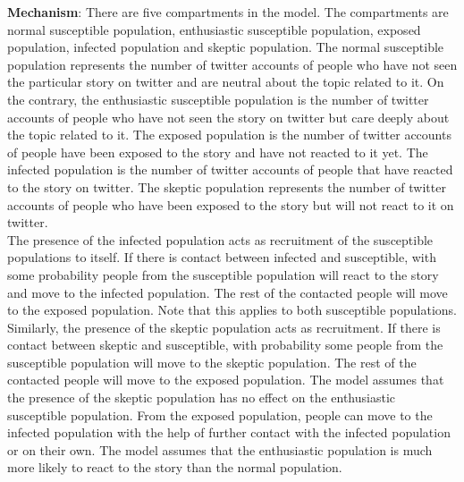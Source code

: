 \documentclass{article}
\begin{document}
\textbf{Mechanism}: There are five compartments in the model. The compartments are normal susceptible population, enthusiastic susceptible population, exposed population, infected population and skeptic population. The normal susceptible population represents the number of twitter accounts of people who have not seen the particular story on twitter and are neutral about the topic related to it. On the contrary, the enthusiastic susceptible population is the number of twitter accounts of people who have not seen the story on twitter but care deeply about the topic related to it. The exposed population is the number of twitter accounts of people have been exposed to the story and have not reacted to it yet. The infected population is the number of twitter accounts of people that have reacted to the story on twitter. The skeptic population represents the number of twitter accounts of people who have been exposed to the story but will not react to it on twitter. 
\\The presence of the infected population acts as recruitment of the susceptible populations to itself. If there is contact between infected and susceptible, with some probability people from the susceptible population will react to the story and move to the infected population. The rest of the contacted people will move to the exposed population. Note that this applies to both susceptible populations. Similarly, the presence of the skeptic population acts as recruitment. If there is contact between skeptic and susceptible, with probability some people from the susceptible population will move to the skeptic population. The rest of the contacted people will move to the exposed population. The model assumes that the presence of the skeptic population has no effect on the enthusiastic susceptible population. From the exposed population, people can move to the infected population with the help of further contact with the infected population or on their own. The model assumes that the enthusiastic population is much more likely to react to the story than the normal population. 
\begin{center}
    

\end{center}
\end{document}
